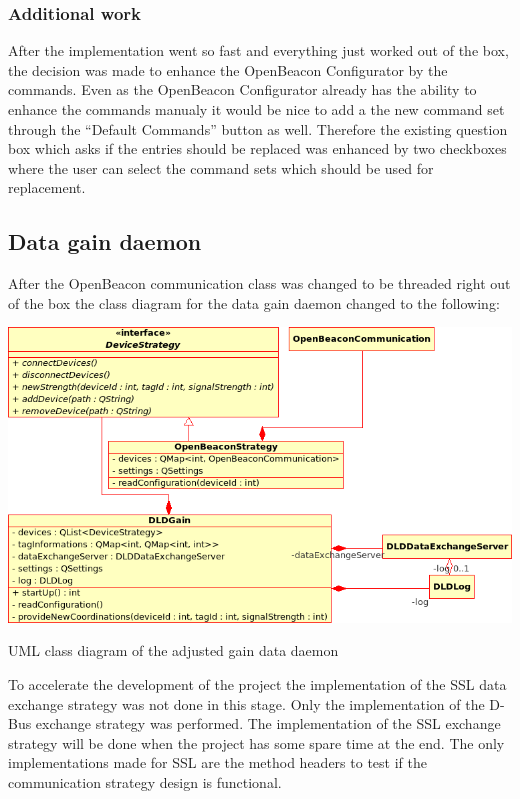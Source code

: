    \subsubsection*{Additional work}
    After the implementation went so fast and everything just worked out of the box, the decision was made to enhance the OpenBeacon Configurator by the commands. Even as the OpenBeacon Configurator already has the ability to enhance the commands manualy it would be nice to add a the new command set through the ``Default Commands'' button as well. Therefore the existing question box which asks if the entries should be replaced was enhanced by two checkboxes where the user can select the command sets which should be used for replacement.

  \subsection{Data gain daemon}
   After the OpenBeacon communication class was changed to be threaded right out of the box the class diagram for the data gain daemon changed to the following:\\

   \begin{staticFigure}
    \includegraphics[scale=0.55]{UMLDiagrams/dldGainNew.png}
    \caption{UML class diagram of the adjusted gain data daemon}
    \label{fg:implementation:newGainDataDaemon}
   \end{staticFigure}

   To accelerate the development of the project the implementation of the SSL data exchange strategy was not done in this stage. Only the implementation of the D-Bus exchange strategy was performed. The implementation of the SSL exchange strategy will be done when the project has some spare time at the end. The only implementations made for SSL are the method headers to test if the communication strategy design is functional.

